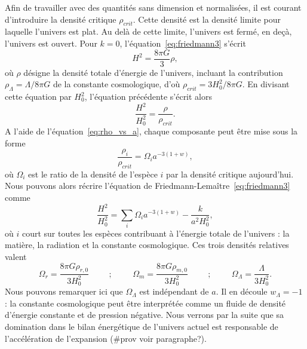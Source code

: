 \documentclass[11pt, twoside, a4paper, openright]{report}
\begin{document}
Afin de travailler avec des quantités sans dimension et normalisées, il est courant d'introduire la densité critique $\rho_{crit}$. Cette densité est la densité limite pour laquelle l'univers est plat. Au delà de cette limite, l'univers est fermé, en deçà, l'univers est ouvert. Pour $k = 0$, l'équation~\ref{eq:friedmann3} s'écrit
\begin{equation}
  H^{2} = \frac{8 \pi G }{3} \rho ,
\end{equation}
où $\rho$ désigne la densité totale d'énergie de l'univers, incluant la contribution $\rho_{\Lambda} = \Lambda / 8 \pi G$ de la constante cosmologique, d'où $\rho_{crit} = 3 H_0^2 / 8 \pi G$. En divisant cette équation par $H_{0}^{2}$, l'équation précédente s'écrit alors
\begin{equation}
  \label{eq:friedmann5}
  \frac{H^2}{H_0^2} = \frac{\rho}{\rho_{crit}} .
\end{equation}
A l'aide de l'équation~\ref{eq:rho_vs_a}, chaque composante peut être mise sous la forme
\begin{equation}
  \label{eq:def_omgega}
  \frac{\rho_i}{\rho_{crit}} = \Omega_i a^{-3 (1+w)} , 
\end{equation}
où $\Omega_i$ est le ratio de la densité de l'espèce $i$ par la densité critique aujourd'hui. Nous pouvons alors récrire l'équation de Friedmann-Lemaître~\ref{eq:friedmann3} comme
\begin{equation}
  \label{eq:friedmann6}
  \frac{H^2}{H_0^2} = \sum_i \Omega_i a^{-3 (1+w)} - \frac{k}{a^{2} H_{0}^{2}},
\end{equation}
où $i$ court sur toutes les espèces contribuant à l'énergie totale de l'univers : la matière, la radiation et la constante cosmologique. Ces trois densités relatives valent
\begin{equation}
  \label{eq:def_omega2}
\Omega_{r} = \frac{8 \pi G \rho_{r, 0}}{3 H_{0}^{2}} \hspace{1cm} ; \hspace{1cm} \Omega_{m} = \frac{8 \pi G \rho_{m, 0}}{3 H_{0}^{2}} \hspace{1cm} ;\hspace{1cm} \Omega_{\Lambda} = \frac{\Lambda}{3 H_{0}^{2}} .
\end{equation}
Nous pouvons remarquer ici que $\Omega_{\Lambda}$ est indépendant de $a$. Il en découle $w_{\Lambda} = -1$ : la constante cosmologique peut être interprétée comme un fluide de densité d'énergie constante et de pression négative. Nous verrons par la suite que sa domination dans le bilan énergétique de l'univers actuel est responsable de l'accélération de l'expansion (\#prov voir paragraphe?).
\end{document}
